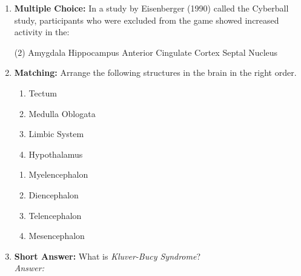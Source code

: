 \begin{enumerate}[label=\textbf{Q1.10.\arabic*}]
            \item \textbf{Multiple Choice:} In a study by Eisenberger (1990) called the Cyberball study, participants who were excluded from the game showed increased activity in the:
            \begin{tasks}[label=\textcolor{\documentTheme}{(\Alph*)}, item-format=\color{\documentTheme}, label-width=1.5em, item-indent=1.7em](2) %
                  \task Amygdala
                  \task Hippocampus
                  \task Anterior Cingulate Cortex
                  \task Septal Nucleus
            \end{tasks}
\newpage
      \item \textbf{Matching:} Arrange the following structures in the brain in the right order.
      \begin{wordbox}
            \begin{enumerate}[label=(\roman*)]
                  \item Tectum
                  \item Medulla Oblogata
                  \item Limbic System
                  \item Hypothalamus
            \end{enumerate}
      \end{wordbox}
      \begin{enumerate}[label=(\alph*)]
            \item Myelencephalon \quad \dotfill \quad \underline{\hspace{3cm}}\\[0.5em]
            \item Diencephalon \quad \dotfill \quad \underline{\hspace{3cm}}\\[0.5em]
            \item Telencephalon \quad \dotfill \quad \underline{\hspace{3cm}}\\[0.5em]
            \item Mesencephalon \quad \dotfill \quad \underline{\hspace{3cm}}\\
      \end{enumerate}

      \item \textbf{Short Answer:} What is \textit{Kluver-Bucy Syndrome}? \\
            \textit{Answer:} %


\end{enumerate}

